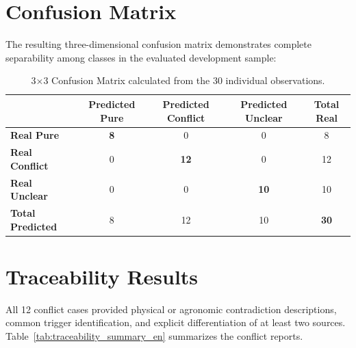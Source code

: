 \documentclass[11pt,a4paper]{article}
\begin{document}
\section{Confusion Matrix}
The resulting three-dimensional confusion matrix demonstrates complete separability among classes in the evaluated development sample:

\begin{table}[H]
\centering
\caption{3×3 Confusion Matrix calculated from the 30 individual observations.}
\label{tab:confusion_matrix_en}
\begin{tabular}{lcccc}
\toprule
& \textbf{Predicted Pure} & \textbf{Predicted Conflict} & \textbf{Predicted Unclear} & \textbf{Total Real} \\
\midrule
\textbf{Real Pure} & \textbf{8} & 0 & 0 & 8 \\
\textbf{Real Conflict} & 0 & \textbf{12} & 0 & 12 \\
\textbf{Real Unclear} & 0 & 0 & \textbf{10} & 10 \\
\midrule
\textbf{Total Predicted} & 8 & 12 & 10 & \textbf{30} \\
\bottomrule
\end{tabular}
\end{table}

\section{Traceability Results}
All 12 conflict cases provided physical or agronomic contradiction descriptions, common trigger identification, and explicit differentiation of at least two sources. Table~\ref{tab:traceability_summary_en} summarizes the conflict reports.
\end{document}
